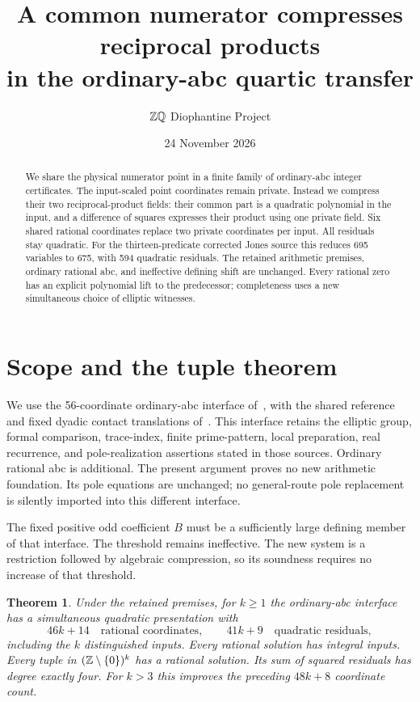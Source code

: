 \documentclass[11pt]{article}
\title{A common numerator compresses reciprocal products\\
in the ordinary-abc quartic transfer}
\author{\(\mathbb Z\mathbb Q\) Diophantine Project}
\date{24 November 2026}
\newtheorem{theorem}{Theorem}
\begin{document}
\maketitle

\begin{abstract}
We share the physical numerator point in a finite family of ordinary-abc
integer certificates. The input-scaled point coordinates remain private.
Instead we compress their two reciprocal-product fields: their common
part is a quadratic polynomial in the input, and a difference of squares
expresses their product using one private field. Six shared rational
coordinates replace two private coordinates per input. All residuals stay
quadratic. For the thirteen-predicate corrected Jones source this reduces
695 variables to 675, with 594 quadratic residuals. The retained arithmetic
premises, ordinary rational abc, and ineffective defining shift are unchanged.
Every rational zero has an explicit polynomial lift to the predecessor;
completeness uses a new simultaneous choice of elliptic witnesses.
\end{abstract}

\section{Scope and the tuple theorem}

We use the 56-coordinate ordinary-abc interface of~\cite{paired}, with
the shared reference and fixed dyadic contact translations
of~\cite{reference,offsets}. This interface retains the elliptic group,
formal comparison, trace-index, finite prime-pattern, local preparation,
real recurrence, and pole-realization assertions stated in those sources.
Ordinary rational abc is additional. The present argument proves no new
arithmetic foundation. Its pole equations are unchanged; no general-route
pole replacement is silently imported into this different interface.

The fixed positive odd coefficient $B$ must be a sufficiently large
defining member of that interface. The threshold remains ineffective.
The new system is a restriction followed by algebraic compression, so its
soundness requires no increase of that threshold.

\begin{theorem}\label{thm:tuple}
Under the retained premises, for $k\ge1$ the ordinary-abc interface has
a simultaneous quadratic presentation with
\[
                  46k+14\quad\text{rational coordinates},\qquad
                  41k+9\quad\text{quadratic residuals},
\]
including the $k$ distinguished inputs. Every rational solution has
integral inputs. Every tuple in $(\mathbb Z\setminus\{0\})^k$ has a rational
solution. Its sum of squared residuals has degree exactly four.
For $k>3$ this improves the preceding $48k+8$ coordinate count.
\end{theorem}
\end{document}
